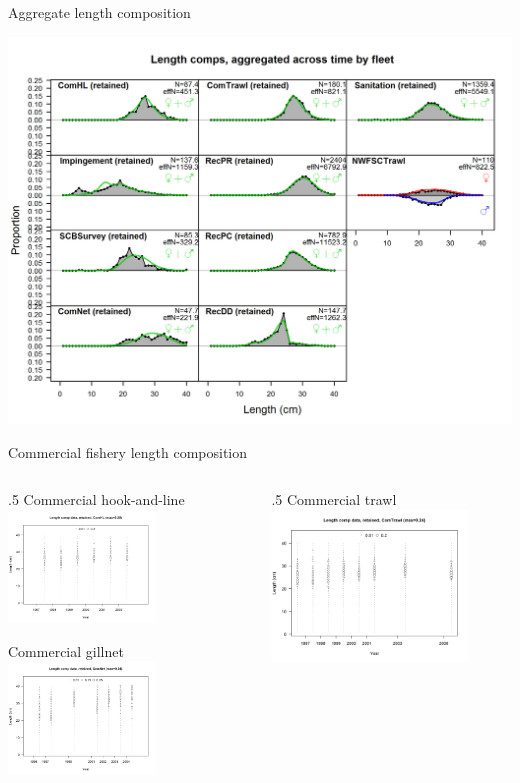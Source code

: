 \documentclass[ignorenonframetext,]{beamer}
\def\begincols{\begin{columns}}
\def\begincol{\begin{column}}
\def\endcol{\end{column}}
\def\endcols{\end{columns}}
\begin{document}
\begin{frame}{Aggregate length composition}

\includegraphics{r4ss/plots_mod1/comp_lenfit__aggregated_across_time.png}

\end{frame}

\begin{frame}{Commercial fishery length composition}

\begincols
 \begincol{.5\textwidth} \centering
 Commercial hook-and-line
\includegraphics[height=3cm]{r4ss/plots_mod1/comp_lendat_bubflt1mkt2.png}

Commercial gillnet
\includegraphics[height=3cm]{r4ss/plots_mod1/comp_lendat_bubflt2mkt2.png}
\endcol
 \begincol{.5\textwidth} \centering
 Commercial trawl
\includegraphics[height=4cm]{r4ss/plots_mod1/comp_lendat_bubflt3mkt2.png}
\endcol
\endcols

\end{frame}
\end{document}

